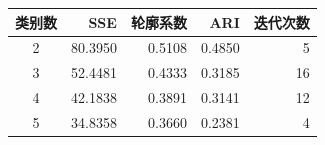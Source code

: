 \begin{tabular}{crrrr}
\toprule
类别数 & SSE & 轮廓系数 & ARI & 迭代次数 \\
\midrule
2 & 80.3950 & 0.5108 & 0.4850 & 5 \\
3 & 52.4481 & 0.4333 & 0.3185 & 16 \\
4 & 42.1838 & 0.3891 & 0.3141 & 12 \\
5 & 34.8358 & 0.3660 & 0.2381 & 4 \\
\bottomrule
\end{tabular}

